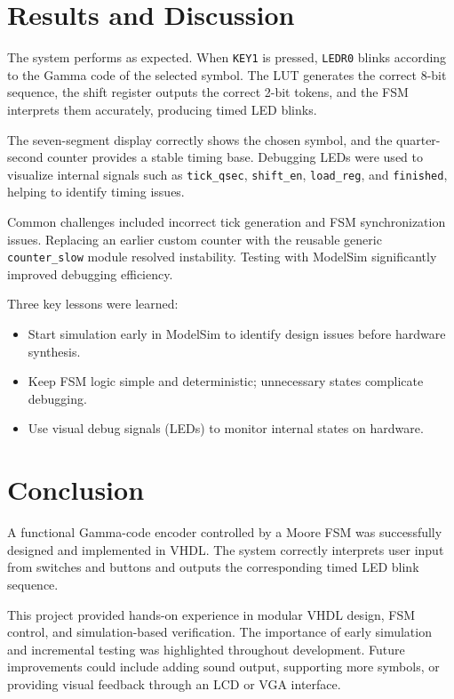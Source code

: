 \documentclass[conference]{IEEEtran}
\begin{document}
\section{Results and Discussion}
The system performs as expected. When \texttt{KEY1} is pressed, \texttt{LEDR0} blinks according to the Gamma code of the selected symbol. The LUT generates the correct 8-bit sequence, the shift register outputs the correct 2-bit tokens, and the FSM interprets them accurately, producing timed LED blinks.

The seven-segment display correctly shows the chosen symbol, and the quarter-second counter provides a stable timing base. Debugging LEDs were used to visualize internal signals such as \texttt{tick\_qsec}, \texttt{shift\_en}, \texttt{load\_reg}, and \texttt{finished}, helping to identify timing issues.

Common challenges included incorrect tick generation and FSM synchronization issues. Replacing an earlier custom counter with the reusable generic \texttt{counter\_slow} module resolved instability. Testing with ModelSim significantly improved debugging efficiency.

Three key lessons were learned:
\begin{itemize}
  \item Start simulation early in ModelSim to identify design issues before hardware synthesis.
  \item Keep FSM logic simple and deterministic; unnecessary states complicate debugging.
  \item Use visual debug signals (LEDs) to monitor internal states on hardware.
\end{itemize}

\section{Conclusion}
A functional Gamma-code encoder controlled by a Moore FSM was successfully designed and implemented in VHDL. The system correctly interprets user input from switches and buttons and outputs the corresponding timed LED blink sequence. 

This project provided hands-on experience in modular VHDL design, FSM control, and simulation-based verification. The importance of early simulation and incremental testing was highlighted throughout development. Future improvements could include adding sound output, supporting more symbols, or providing visual feedback through an LCD or VGA interface.
\end{document}
